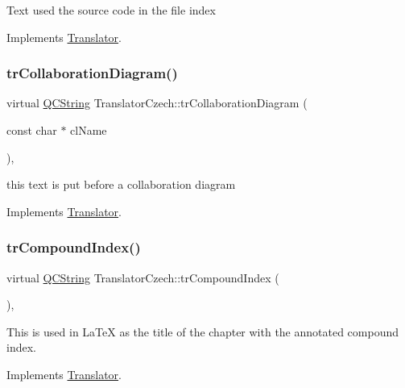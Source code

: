 Text used the source code in the file index 

Implements \mbox{\hyperlink{class_translator}{Translator}}.

\mbox{\label{class_translator_czech_ad482483ef0225afa2906f3504425eb9b}} 
\subsubsection{\texorpdfstring{trCollaborationDiagram()}{trCollaborationDiagram()}}
{\footnotesize\ttfamily virtual \mbox{\hyperlink{class_q_c_string}{Q\+C\+String}} Translator\+Czech\+::tr\+Collaboration\+Diagram (\begin{DoxyParamCaption}\item[{const char $\ast$}]{cl\+Name }\end{DoxyParamCaption})\hspace{0.3cm}{\ttfamily [inline]}, {\ttfamily [virtual]}}

this text is put before a collaboration diagram 

Implements \mbox{\hyperlink{class_translator}{Translator}}.

\mbox{\label{class_translator_czech_a0278a54a8289de74e9073eeec2442b43}} 
\subsubsection{\texorpdfstring{trCompoundIndex()}{trCompoundIndex()}}
{\footnotesize\ttfamily virtual \mbox{\hyperlink{class_q_c_string}{Q\+C\+String}} Translator\+Czech\+::tr\+Compound\+Index (\begin{DoxyParamCaption}{ }\end{DoxyParamCaption})\hspace{0.3cm}{\ttfamily [inline]}, {\ttfamily [virtual]}}

This is used in La\+TeX as the title of the chapter with the annotated compound index. 

Implements \mbox{\hyperlink{class_translator}{Translator}}.

\mbox{\label{class_translator_czech_acded3cae09ce0601be33e32a08abab89}} 
